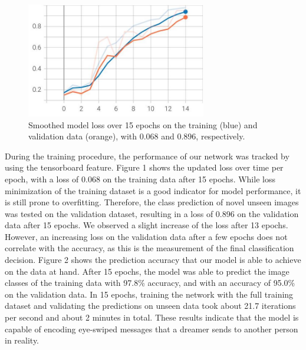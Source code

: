\documentclass{article}
\begin{document}
\begin{figure}[H]
\centering
\includegraphics[width=0.7\textwidth]{fig1.jpg}
\caption{\label{fig:fig1} Smoothed model loss over 15 epochs on the training (blue) and validation data (orange), with 0.068 and 0.896, respectively.}
\end{figure}

\noindent
During the training procedure, the performance of our network was tracked by using the tensorboard feature. Figure 1 shows the updated loss over time per epoch, with a loss of 0.068 on the training data after 15 epochs. While loss minimization of the training dataset is a good indicator for model performance, it is still prone to overfitting. Therefore, the class prediction of novel unseen images was tested on the validation dataset, resulting in a loss of 0.896 on the validation data after 15 epochs. We observed a slight increase of the loss after 13 epochs. However, an increasing loss on the validation data after a few epochs does not correlate with the accuracy, as this is the measurement of the final classification decision. Figure 2 shows the prediction accuracy that our model is able to achieve on the data at hand. After 15 epochs, the model was able to predict the image classes of the training data with 97.8\% accuracy, and with an accuracy of 95.0\% on the validation data. In 15 epochs, training the network with the full training dataset and validating the predictions on unseen data took about 21.7 iterations per second and about 2 minutes in total. These results indicate that the model is capable of encoding eye-swiped messages that a dreamer sends to another person in reality.
\\
\end{document}
